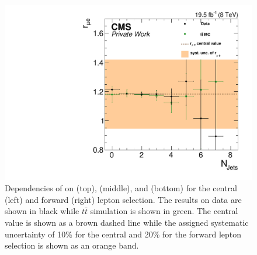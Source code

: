 \begin{figure}[htbp]
\begin{minipage}[t]{0.49\textwidth}
\includegraphics[width=\textwidth]{plots/BG/rmue/rMuE_ZPeakControlForward_Full2012_NJets_None.pdf}
\end{minipage}
\caption{Dependencies of \rmue on \mll (top), \MET (middle), and \njets (bottom) for the central (left) and forward (right) lepton selection. The results on data are shown in black while $t\bar{t}$ simulation is shown in green. The central value is shown as a brown dashed line while the assigned systematic uncertainty of 10\% for the central and 20\% for the forward lepton selection is shown as an orange band.}
\label{fig:rmueDependencies}
\end{figure} 
